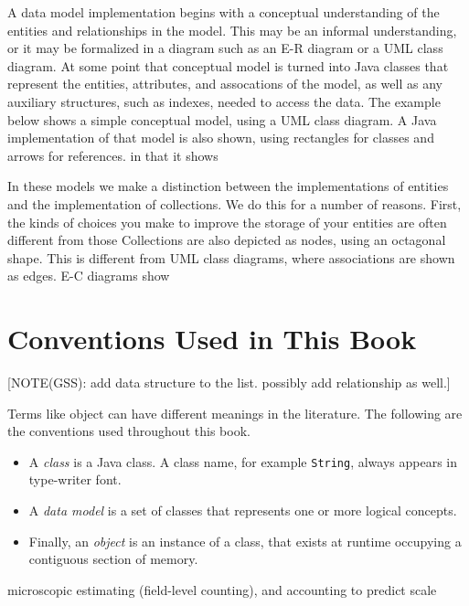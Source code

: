 A data model implementation begins with a conceptual understanding of the
entities and relationships in the model.  This may be an informal understanding,
or it may be formalized in a diagram such as an E-R diagram or a UML class
diagram.  At some point that conceptual model is turned into Java classes that
represent the entities, attributes, and assocations of the model, as well as any
auxiliary structures, such as indexes, needed to access the data.  The example
below shows a simple conceptual model, using a UML class diagram.  A Java
implementation of that model is also shown, using rectangles for classes and
arrows for references.  %
in that it shows


In these models we make a distinction between the implementations of entities
and the implementation of collections.  We do this for a number of reasons. 
First, the kinds of choices you make to improve the storage of your entities are
often different from those Collections are also depicted as nodes, using an
octagonal shape.  This is different from UML class diagrams, where associations
are shown as edges. E-C diagrams show


\section{Conventions Used in This Book}

[NOTE(GSS): add data structure to the list.  possibly add relationship as well.]

Terms like object can have different meanings in the literature.  The following are the conventions used throughout this book.

\begin{itemize}
\item A \textit{class} is a Java class. A class name, for example \texttt{String}, always appears in type-writer font. 
\item A \textit{data model} is a set of classes that represents one or more logical concepts.
\item Finally, an \textit{object} is an instance of a class, that exists at runtime occupying a contiguous section of memory.
\end{itemize} 







 
microscopic estimating (field-level counting), and accounting to predict
scale

